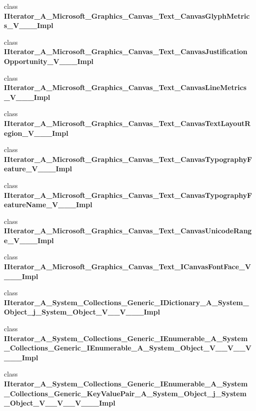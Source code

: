 \begin{DoxyCompactItemize}
class {\bfseries I\+Iterator\+\_\+\+A\+\_\+\+Microsoft\+\_\+\+Graphics\+\_\+\+Canvas\+\_\+\+Text\+\_\+\+Canvas\+Glyph\+Metrics\+\_\+\+V\+\_\+\+\_\+\+\_\+\+Impl}
\item 
class {\bfseries I\+Iterator\+\_\+\+A\+\_\+\+Microsoft\+\_\+\+Graphics\+\_\+\+Canvas\+\_\+\+Text\+\_\+\+Canvas\+Justification\+Opportunity\+\_\+\+V\+\_\+\+\_\+\+\_\+\+Impl}
\item 
class {\bfseries I\+Iterator\+\_\+\+A\+\_\+\+Microsoft\+\_\+\+Graphics\+\_\+\+Canvas\+\_\+\+Text\+\_\+\+Canvas\+Line\+Metrics\+\_\+\+V\+\_\+\+\_\+\+\_\+\+Impl}
\item 
class {\bfseries I\+Iterator\+\_\+\+A\+\_\+\+Microsoft\+\_\+\+Graphics\+\_\+\+Canvas\+\_\+\+Text\+\_\+\+Canvas\+Text\+Layout\+Region\+\_\+\+V\+\_\+\+\_\+\+\_\+\+Impl}
\item 
class {\bfseries I\+Iterator\+\_\+\+A\+\_\+\+Microsoft\+\_\+\+Graphics\+\_\+\+Canvas\+\_\+\+Text\+\_\+\+Canvas\+Typography\+Feature\+\_\+\+V\+\_\+\+\_\+\+\_\+\+Impl}
\item 
class {\bfseries I\+Iterator\+\_\+\+A\+\_\+\+Microsoft\+\_\+\+Graphics\+\_\+\+Canvas\+\_\+\+Text\+\_\+\+Canvas\+Typography\+Feature\+Name\+\_\+\+V\+\_\+\+\_\+\+\_\+\+Impl}
\item 
class {\bfseries I\+Iterator\+\_\+\+A\+\_\+\+Microsoft\+\_\+\+Graphics\+\_\+\+Canvas\+\_\+\+Text\+\_\+\+Canvas\+Unicode\+Range\+\_\+\+V\+\_\+\+\_\+\+\_\+\+Impl}
\item 
class {\bfseries I\+Iterator\+\_\+\+A\+\_\+\+Microsoft\+\_\+\+Graphics\+\_\+\+Canvas\+\_\+\+Text\+\_\+\+I\+Canvas\+Font\+Face\+\_\+\+V\+\_\+\+\_\+\+\_\+\+Impl}
\item 
class {\bfseries I\+Iterator\+\_\+\+A\+\_\+\+System\+\_\+\+Collections\+\_\+\+Generic\+\_\+\+I\+Dictionary\+\_\+\+A\+\_\+\+System\+\_\+\+Object\+\_\+j\+\_\+\+System\+\_\+\+Object\+\_\+\+V\+\_\+\+\_\+\+V\+\_\+\+\_\+\+\_\+\+Impl}
\item 
class {\bfseries I\+Iterator\+\_\+\+A\+\_\+\+System\+\_\+\+Collections\+\_\+\+Generic\+\_\+\+I\+Enumerable\+\_\+\+A\+\_\+\+System\+\_\+\+Collections\+\_\+\+Generic\+\_\+\+I\+Enumerable\+\_\+\+A\+\_\+\+System\+\_\+\+Object\+\_\+\+V\+\_\+\+\_\+\+V\+\_\+\+\_\+\+V\+\_\+\+\_\+\+\_\+\+Impl}
\item 
class {\bfseries I\+Iterator\+\_\+\+A\+\_\+\+System\+\_\+\+Collections\+\_\+\+Generic\+\_\+\+I\+Enumerable\+\_\+\+A\+\_\+\+System\+\_\+\+Collections\+\_\+\+Generic\+\_\+\+Key\+Value\+Pair\+\_\+\+A\+\_\+\+System\+\_\+\+Object\+\_\+j\+\_\+\+System\+\_\+\+Object\+\_\+\+V\+\_\+\+\_\+\+V\+\_\+\+\_\+\+V\+\_\+\+\_\+\+\_\+\+Impl}

\end{DoxyCompactItemize}
